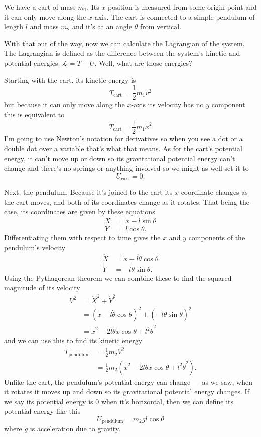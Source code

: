 \documentclass{article}
\begin{document}
We have a cart of mass $m_1$. Its $x$ position is measured from some origin point and it can only move along the $x$-axis. The cart is connected to a simple pendulum of length $l$ and mass $m_2$ and it's at an angle $\theta$ from vertical.

With that out of the way, now we can calculate the Lagrangian of the system. The Lagrangian is defined as the difference between the system's kinetic and potential energies: $\mathcal{L} = T - U$. Well, what are those energies?

Starting with the cart, its kinetic energy is \[T_\text{cart} = \frac{1}{2} m_1 v^2\] but because it can only move along the $x$-axis its velocity has no $y$ component this is equivalent to \[T_\text{cart} = \frac{1}{2} m_1 \dot{x}^2\] I'm going to use Newton's notation for derivatives so when you see a dot or a double dot over a variable that's what that means. As for the cart's potential energy, it can't move up or down so its gravitational potential energy can't change and there's no springs or anything involved so we might as well set it to \[U_\text{cart} = 0.\]

Next, the pendulum. Because it's joined to the cart its $x$ coordinate changes as the cart moves, and both of its coordinates change as it rotates. That being the case, its coordinates are given by these equations \begin{align*}
  X & = x - l \sin \theta \\
  Y & = l \cos \theta.
\end{align*} Differentiating them with respect to time gives the $x$ and $y$ components of the pendulum's velocity \begin{align*}
  \dot{X} & = \dot{x} - l \dot{\theta} \cos \theta \\
  \dot{Y} & = -l \dot{\theta} \sin \theta.
\end{align*} Using the Pythagorean theorem we can combine these to find the squared magnitude of its velocity \begin{align*}
  V^2 & = \dot{X}^2 + \dot{Y}^2                                                      \\
      & = (\dot{x} - l \dot{\theta} \cos \theta)^2 + (-l \dot{\theta} \sin \theta)^2 \\
      & = \dot{x}^2 - 2 l \dot{\theta} \dot{x} \cos \theta + l^2 \dot{\theta}^2
\end{align*}
and we can use this to find its kinetic energy \begin{align*}
T_\text{pendulum} & = \frac{1}{2} m_2 V^2                                                                          \\
                    & = \frac{1}{2} m_2 (\dot{x}^2 - 2 l \dot{\theta} \dot{x} \cos \theta + l^2 \dot{\theta}^2).
\end{align*} Unlike the cart, the pendulum's potential energy can change — as we saw, when it rotates it moves up and down so its gravitational potential energy changes. If we say its potential energy is $0$ when it's horizontal, then we can define its potential energy like this \[U_\text{pendulum} = m_2 g l \cos \theta\] where $g$ is acceleration due to gravity.
\end{document}
